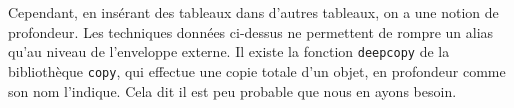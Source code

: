 Cependant, en insérant des tableaux dans d'autres tableaux, on a une notion de \og profondeur\fg. Les 
techniques données ci-dessus ne permettent de rompre un alias qu'au niveau de l'enveloppe externe. 
Il existe la fonction \texttt{deepcopy} de la bibliothèque \texttt{copy}, qui effectue une copie totale 
d'un objet, en profondeur comme son nom l'indique. Cela dit il est peu probable que nous en ayons 
besoin.

%
%
%
%    
%
%
%
%
%
%
%
%
%
